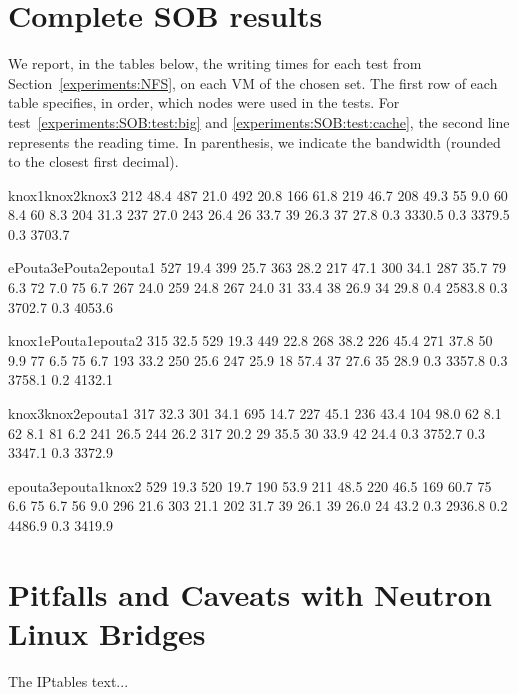 \section{Complete SOB results}
\label{appendix:SOB}

We report, in the tables below, the writing times for each test from
Section~\ref{experiments:NFS}, on each VM of the chosen set.
%
The first row of each table specifies, in order, which nodes were used
in the tests.
%
For test~\ref{experiments:SOB:test:big} and
\ref{experiments:SOB:test:cache}, the second line represents the
reading time. In parenthesis, we indicate the bandwidth (rounded to
the closest first decimal).%

\noindent%
\resultpartition%
{{knox1}{knox2}{knox3}}%
{{ 212 }{ 48.4   }{ 487 }{ 21.0   }{ 492 }{ 20.8   }}%
{{ 166 }{ 61.8   }{ 219 }{ 46.7   }{ 208 }{ 49.3   }}%
{{  55 }{ 9.0    }{  60 }{ 8.4    }{  60 }{ 8.3    }}%
{{ 204 }{ 31.3   }{ 237 }{ 27.0   }{ 243 }{ 26.4   }}%
{{  26 }{ 33.7   }{  39 }{ 26.3   }{  37 }{ 27.8   }}%
{{ 0.3 }{ 3330.5 }{ 0.3 }{ 3379.5 }{ 0.3 }{ 3703.7 }}

\noindent%
\resultpartition%
{{ePouta3}{ePouta2}{epouta1}}%
{{ 527 }{ 19.4   }{ 399 }{ 25.7   }{ 363 }{ 28.2   }}%
{{ 217 }{ 47.1   }{ 300 }{ 34.1   }{ 287 }{ 35.7   }}%
{{  79 }{ 6.3    }{  72 }{ 7.0    }{  75 }{ 6.7    }}%
{{ 267 }{ 24.0   }{ 259 }{ 24.8   }{ 267 }{ 24.0   }}%
{{  31 }{ 33.4   }{  38 }{ 26.9   }{  34 }{ 29.8   }}%
{{ 0.4 }{ 2583.8 }{ 0.3 }{ 3702.7 }{ 0.3 }{ 4053.6 }}

\noindent%
\resultpartition%
{{knox1}{ePouta1}{epouta2}}%
{{ 315 }{ 32.5   }{ 529 }{ 19.3   }{ 449 }{ 22.8   }}%
{{ 268 }{ 38.2   }{ 226 }{ 45.4   }{ 271 }{ 37.8   }}%
{{  50 }{ 9.9    }{  77 }{ 6.5    }{  75 }{ 6.7    }}%
{{ 193 }{ 33.2   }{ 250 }{ 25.6   }{ 247 }{ 25.9   }}%
{{  18 }{ 57.4   }{  37 }{ 27.6   }{  35 }{ 28.9   }}%
{{ 0.3 }{ 3357.8 }{ 0.3 }{ 3758.1 }{ 0.2 }{ 4132.1 }}

\noindent%
\resultpartition%
{{knox3}{knox2}{epouta1}}%
{{ 317 }{ 32.3   }{ 301 }{ 34.1   }{ 695 }{ 14.7   }}%
{{ 227 }{ 45.1   }{ 236 }{ 43.4   }{ 104 }{ 98.0   }}%
{{  62 }{  8.1   }{  62 }{  8.1   }{  81 }{  6.2   }}%
{{ 241 }{ 26.5   }{ 244 }{ 26.2   }{ 317 }{ 20.2   }}%
{{  29 }{ 35.5   }{  30 }{ 33.9   }{  42 }{ 24.4   }}%
{{ 0.3 }{ 3752.7 }{ 0.3 }{ 3347.1 }{ 0.3 }{ 3372.9 }}

\noindent%
\resultpartition%
{{epouta3}{epouta1}{knox2}}%
{{ 529 }{ 19.3   }{ 520 }{ 19.7   }{ 190 }{ 53.9   }}%
{{ 211 }{ 48.5   }{ 220 }{ 46.5   }{ 169 }{ 60.7   }}%
{{  75 }{  6.6   }{  75 }{  6.7   }{  56 }{  9.0   }}%
{{ 296 }{ 21.6   }{ 303 }{ 21.1   }{ 202 }{ 31.7   }}%
{{  39 }{ 26.1   }{  39 }{ 26.0   }{  24 }{ 43.2   }}%
{{ 0.3 }{ 2936.8 }{ 0.2 }{ 4486.9 }{ 0.3 }{ 3419.9 }}


\section{Pitfalls and Caveats with Neutron Linux Bridges}
\label{appendix:neutron:linux:bridge}

The IPtables text...
